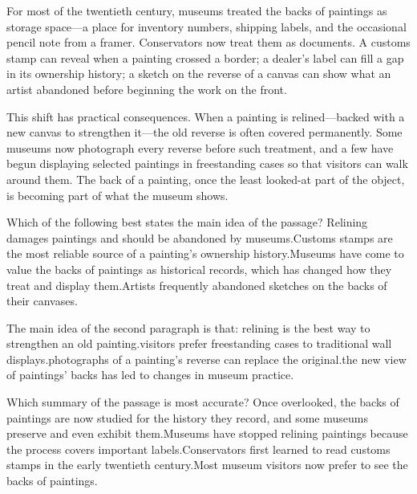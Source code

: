 \documentclass[11pt]{article}
\begin{document}
\begin{passage}
For most of the twentieth century, museums treated the backs of paintings as storage space---a place for inventory numbers, shipping labels, and the occasional pencil note from a framer. Conservators now treat them as documents. A customs stamp can reveal when a painting crossed a border; a dealer's label can fill a gap in its ownership history; a sketch on the reverse of a canvas can show what an artist abandoned before beginning the work on the front.

This shift has practical consequences. When a painting is relined---backed with a new canvas to strengthen it---the old reverse is often covered permanently. Some museums now photograph every reverse before such treatment, and a few have begun displaying selected paintings in freestanding cases so that visitors can walk around them. The back of a painting, once the least looked-at part of the object, is becoming part of what the museum shows.
\end{passage}

{Which of the following best states the main idea of the passage?}
{Relining damages paintings and should be abandoned by museums.}{Customs stamps are the most reliable source of a painting's ownership history.}{Museums have come to value the backs of paintings as historical records, which has changed how they treat and display them.}{Artists frequently abandoned sketches on the backs of their canvases.}

{The main idea of the second paragraph is that:}
{relining is the best way to strengthen an old painting.}{visitors prefer freestanding cases to traditional wall displays.}{photographs of a painting's reverse can replace the original.}{the new view of paintings' backs has led to changes in museum practice.}

{Which summary of the passage is most accurate?}
{Once overlooked, the backs of paintings are now studied for the history they record, and some museums preserve and even exhibit them.}{Museums have stopped relining paintings because the process covers important labels.}{Conservators first learned to read customs stamps in the early twentieth century.}{Most museum visitors now prefer to see the backs of paintings.}
\end{document}
